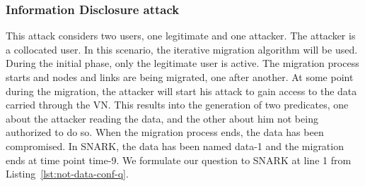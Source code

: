 \subsubsection{Information Disclosure attack}
This attack considers two users, one legitimate and one attacker.
The attacker is a collocated user.
In this scenario, the iterative migration algorithm will be used.
During the initial phase, only the legitimate user is active.
The migration process starts and nodes and links are being migrated, one after another.
At some point during the migration, the attacker will start his attack to gain access to the data carried through the VN.
This results into the generation of two predicates, one about the attacker reading the data, and the other about him not being authorized to do so. 
When the migration process ends, the data has been compromised.
In SNARK, the data has been named data-1 and the migration ends at time point time-9.
We formulate our question to SNARK at line 1 from Listing~\ref{lst:not-data-conf-q}.

